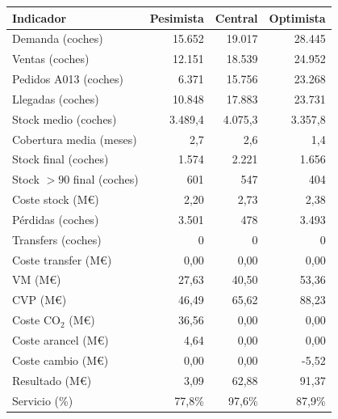 \begin{tabular}{lrrr}
\toprule
Indicador & Pesimista & Central & Optimista \\
\midrule
Demanda (coches) & 15.652 & 19.017 & 28.445 \\
Ventas (coches) & 12.151 & 18.539 & 24.952 \\
Pedidos A013 (coches) & 6.371 & 15.756 & 23.268 \\
Llegadas (coches) & 10.848 & 17.883 & 23.731 \\
Stock medio (coches) & 3.489,4 & 4.075,3 & 3.357,8 \\
Cobertura media (meses) & 2,7 & 2,6 & 1,4 \\
Stock final (coches) & 1.574 & 2.221 & 1.656 \\
Stock $>90$ final (coches) & 601 & 547 & 404 \\
Coste stock (M€) & 2,20 & 2,73 & 2,38 \\
Pérdidas (coches) & 3.501 & 478 & 3.493 \\
Transfers (coches) & 0 & 0 & 0 \\
Coste transfer (M€) & 0,00 & 0,00 & 0,00 \\
VM (M€) & 27,63 & 40,50 & 53,36 \\
CVP (M€) & 46,49 & 65,62 & 88,23 \\
Coste CO$_2$ (M€) & 36,56 & 0,00 & 0,00 \\
Coste arancel (M€) & 4,64 & 0,00 & 0,00 \\
Coste cambio (M€) & 0,00 & 0,00 & -5,52 \\
Resultado (M€) & 3,09 & 62,88 & 91,37 \\
Servicio (\%) & 77,8\% & 97,6\% & 87,9\% \\
\bottomrule
\end{tabular}

